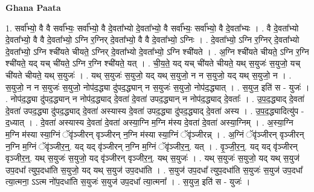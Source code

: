 \documentclass[17pt]{extarticle}
\begin{document}
\textbf{Ghana Paata } \newline

1. सर्वा᳚भ्यो॒ वै वै सर्वा᳚भ्यः॒ सर्वा᳚भ्यो॒ वै दे॒वता᳚भ्यो दे॒वता᳚भ्यो॒ वै सर्वा᳚भ्यः॒ सर्वा᳚भ्यो॒ वै दे॒वता᳚भ्यः । . वै दे॒वता᳚भ्यो दे॒वता᳚भ्यो॒ वै वै दे॒वता᳚भ्यो॒ ऽग्नि र॒ग्निर् दे॒वता᳚भ्यो॒ वै वै दे॒वता᳚भ्यो॒ ऽग्निः । . दे॒वता᳚भ्यो॒ ऽग्नि र॒ग्निर् दे॒वता᳚भ्यो दे॒वता᳚भ्यो॒ ऽग्नि श्ची॑यते चीयते॒ ऽग्निर् दे॒वता᳚भ्यो दे॒वता᳚भ्यो॒ ऽग्नि श्ची॑यते । . अ॒ग्नि श्ची॑यते चीयते॒ ऽग्नि र॒ग्नि श्ची॑यते॒ यद् यच् ची॑यते॒ ऽग्नि र॒ग्नि श्ची॑यते॒ यत् । . ची॒य॒ते॒ यद् यच् ची॑यते चीयते॒ यथ् स॒युजः॑ स॒युजो॒ यच् ची॑यते चीयते॒ यथ् स॒युजः॑ । . यथ् स॒युजः॑ स॒युजो॒ यद् यथ् स॒युजो॒ न न स॒युजो॒ यद् यथ् स॒युजो॒ न । . स॒युजो॒ न न स॒युजः॑ स॒युजो॒ नोप॑द॒द्ध्या दु॑पद॒द्ध्यान् न स॒युजः॑ स॒युजो॒ नोप॑द॒द्ध्यात् । . स॒युज॒ इति॑ स - युजः॑ । . नोप॑द॒द्ध्या दु॑पद॒द्ध्यान् न नोप॑द॒द्ध्याद् दे॒वता॑ दे॒वता॑ उपद॒द्ध्यान् न नोप॑द॒द्ध्याद् दे॒वताः᳚ । . उ॒प॒द॒द्ध्याद् दे॒वता॑ दे॒वता॑ उपद॒द्ध्या दु॑पद॒द्ध्याद् दे॒वता॑ अस्यास्य दे॒वता॑ उपद॒द्ध्या दु॑पद॒द्ध्याद् दे॒वता॑ अस्य । . उ॒प॒द॒द्ध्यादित्यु॑प - द॒ध्यात् । . दे॒वता॑ अस्यास्य दे॒वता॑ दे॒वता॑ अस्या॒ग्नि म॒ग्नि म॑स्य दे॒वता॑ दे॒वता॑ अस्या॒ग्निम् । . अ॒स्या॒ग्नि म॒ग्नि म॑स्या स्या॒ग्निं ॅवृ॑ञ्जीरन् वृञ्जीरन् न॒ग्नि म॑स्या स्या॒ग्निं ॅवृ॑ञ्जीरन्न् । . अ॒ग्निं ॅवृ॑ञ्जीरन् वृञ्जीरन् न॒ग्नि म॒ग्निं ॅवृ॑ञ्जीर॒न्॒. यद् यद् वृ॑ञ्जीरन् न॒ग्नि म॒ग्निं ॅवृ॑ञ्जीर॒न्॒. यत् । . वृ॒ञ्जी॒र॒न्॒. यद् यद् वृ॑ञ्जीरन् वृञ्जीर॒न्॒. यथ् स॒युजः॑ स॒युजो॒ यद् वृ॑ञ्जीरन् वृञ्जीर॒न्॒. यथ् स॒युजः॑ । . यथ् स॒युजः॑ स॒युजो॒ यद् यथ् स॒युज॑ उप॒दधा᳚ त्युप॒दधा॑ति स॒युजो॒ यद् यथ् स॒युज॑ उप॒दधा॑ति । . स॒युज॑ उप॒दधा᳚ त्युप॒दधा॑ति स॒युजः॑ स॒युज॑ उप॒दधा᳚ त्या॒त्मना॒ ऽऽत्म नो॑प॒दधा॑ति स॒युजः॑ स॒युज॑ उप॒दधा᳚ त्या॒त्मना᳚ । . स॒युज॒ इति॑ स - युजः॑ । \newline
\end{document}
